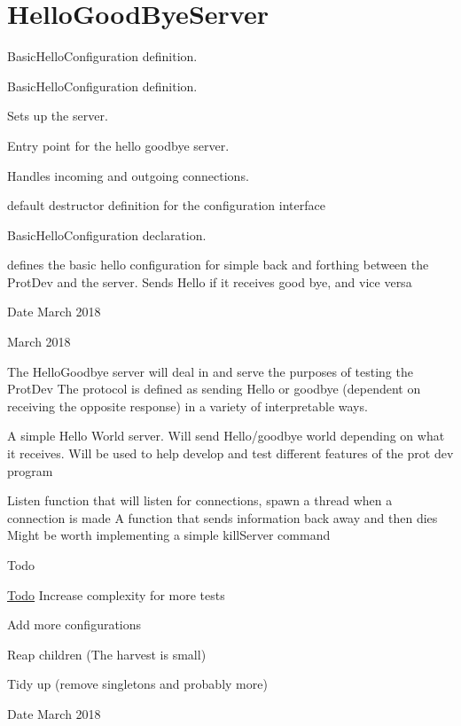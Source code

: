 \hypertarget{group__HelloGoodByeServer}{}\section{Hello\+Good\+Bye\+Server}
\label{group__HelloGoodByeServer}


Basic\+Hello\+Configuration definition.  


Basic\+Hello\+Configuration definition. 

Sets up the server.

Entry point for the hello goodbye server.

Handles incoming and outgoing connections.

default destructor definition for the configuration interface

Basic\+Hello\+Configuration declaration.

defines the basic hello configuration for simple back and forthing between the Prot\+Dev and the server. Sends Hello if it receives good bye, and vice versa

\begin{DoxyDate}{Date}
March 2018

March 2018
\end{DoxyDate}
The Hello\+Goodbye server will deal in and serve the purposes of testing the Prot\+Dev The protocol is defined as sending Hello or goodbye (dependent on receiving the opposite response) in a variety of interpretable ways.

A simple Hello World server. Will send Hello/goodbye world depending on what it receives. Will be used to help develop and test different features of the prot dev program

Listen function that will listen for connections, spawn a thread when a connection is made A function that sends information back away and then dies Might be worth implementing a simple kill\+Server command

\begin{DoxyRefDesc}{Todo}
\item[\mbox{\hyperlink{todo__todo000001}{Todo}}]Increase complexity for more tests 

Add more configurations 

Reap children (The harvest is small) 

Tidy up (remove singletons and probably more)\end{DoxyRefDesc}


\begin{DoxyDate}{Date}
March 2018 
\end{DoxyDate}
